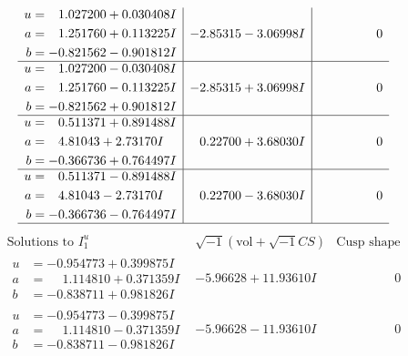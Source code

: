 \documentclass[1p]{elsarticle_modified}
\theoremstyle{definition}
\newcommand{\I}{\sqrt{-1}}
\begin{document}
$$\begin{array}{c|c|c}
\begin{aligned}
u &= \phantom{-}1.027200 + 0.030408 I \\
a &= \phantom{-}1.251760 + 0.113225 I \\
b &= -0.821562 - 0.901812 I\end{aligned}
 & -2.85315 - 3.06998 I & \phantom{-0.000000 } 0 \\ \hline\begin{aligned}
u &= \phantom{-}1.027200 - 0.030408 I \\
a &= \phantom{-}1.251760 - 0.113225 I \\
b &= -0.821562 + 0.901812 I\end{aligned}
 & -2.85315 + 3.06998 I & \phantom{-0.000000 } 0 \\ \hline\begin{aligned}
u &= \phantom{-}0.511371 + 0.891488 I \\
a &= \phantom{-}4.81043 + 2.73170 I \\
b &= -0.366736 + 0.764497 I\end{aligned}
 & \phantom{-}0.22700 + 3.68030 I & \phantom{-0.000000 } 0 \\ \hline\begin{aligned}
u &= \phantom{-}0.511371 - 0.891488 I \\
a &= \phantom{-}4.81043 - 2.73170 I \\
b &= -0.366736 - 0.764497 I\end{aligned}
 & \phantom{-}0.22700 - 3.68030 I & \phantom{-0.000000 } 0\\
 \hline 
 \end{array}$$\newpage$$\begin{array}{c|c|c}  
\text{Solutions to }I^u_{1}& \I (\text{vol} + \sqrt{-1}CS) & \text{Cusp shape}\\
 \hline 
\begin{aligned}
u &= -0.954773 + 0.399875 I \\
a &= \phantom{-}1.114810 + 0.371359 I \\
b &= -0.838711 + 0.981826 I\end{aligned}
 & -5.96628 + 11.93610 I & \phantom{-0.000000 } 0 \\ \hline\begin{aligned}
u &= -0.954773 - 0.399875 I \\
a &= \phantom{-}1.114810 - 0.371359 I \\
b &= -0.838711 - 0.981826 I\end{aligned}
 & -5.96628 - 11.93610 I & \phantom{-0.000000 } 0 \\ \hline\begin{aligned}

\end{aligned}
\end{array}$$
\end{document}
